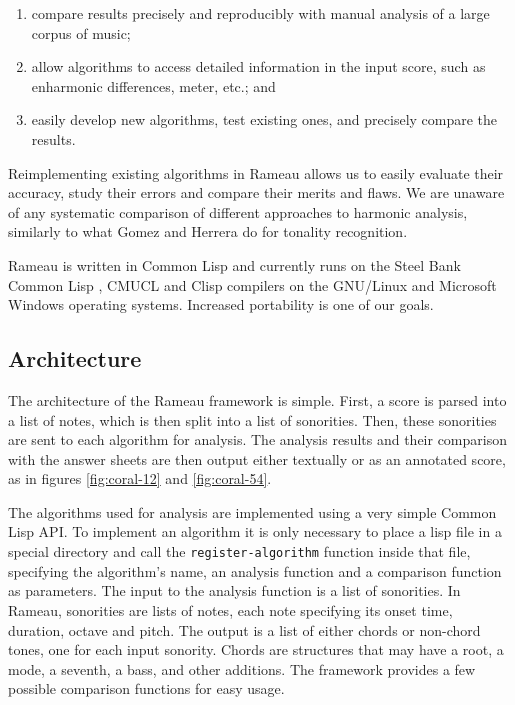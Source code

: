 \documentclass{article}
\begin{document}
\begin{enumerate}
\item compare results precisely and reproducibly with manual analysis
  of a large corpus of music;
\item allow algorithms to access detailed information in the input score,
  such as enharmonic differences, meter, etc.; and
\item easily develop new algorithms, test existing ones, and precisely
  compare the results.
\end{enumerate}

Reimplementing existing algorithms in Rameau allows us to easily
evaluate their accuracy, study their errors and compare their merits
and flaws. We are unaware of any systematic comparison of different
approaches to harmonic analysis, similarly to what Gomez and Herrera
\cite{gomez.ea:song} do for tonality recognition.

Rameau is written in Common Lisp and currently runs on the Steel Bank
Common Lisp \cite{team:sbcl}, CMUCL \cite{maclachlan:cmucl} and Clisp
\cite{haible.ea:clisp} compilers on the GNU/Linux and Microsoft
Windows operating systems. Increased portability is one of our goals.

\subsection{Architecture}
\label{sec:architecture-and-api}

The architecture of the Rameau framework is simple. First, a score is
parsed into a list of notes, which is then split into a list of
sonorities. Then, these sonorities are sent to each algorithm for
analysis. The analysis results and their comparison with the answer
sheets are then output either textually or as an annotated score, as
in figures \ref{fig:coral-12} and \ref{fig:coral-54}.

The algorithms used for analysis are implemented using a very simple
Common Lisp API. To implement an algorithm it is only necessary to
place a lisp file in a special directory and call the
\texttt{register-algorithm} function inside that file, specifying the
algorithm's name, an analysis function and a comparison function as
parameters. The input to the analysis function is a list of
sonorities. In Rameau, sonorities are lists of notes, each note
specifying its onset time, duration, octave and pitch. The output is a
list of either chords or non-chord tones, one for each input sonority.
Chords are structures that may have a root, a mode, a seventh, a bass,
and other additions. The framework provides a few possible comparison
functions for easy usage.
\end{document}
